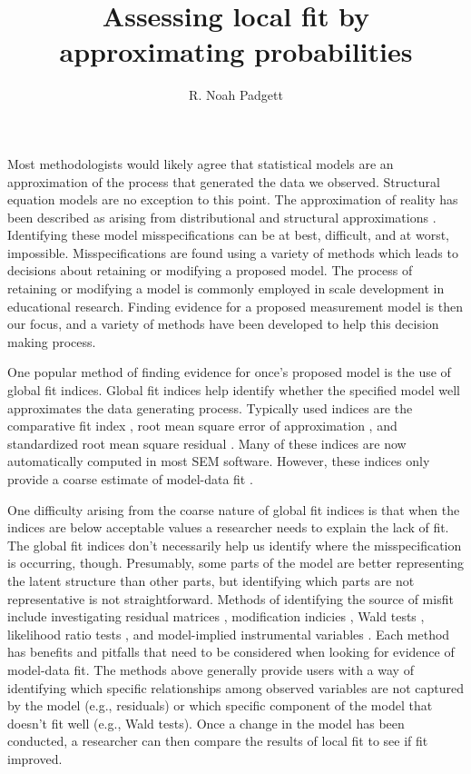 \documentclass[noextraspace, floatsintext, 12pt]{apa7}
\title{Assessing local fit by approximating probabilities}
\author{R. Noah Padgett}
\begin{document}
\maketitle

\setlength{\abovedisplayskip}{3pt}
\setlength{\belowdisplayskip}{3pt}

Most methodologists would likely agree that statistical models are an approximation of the process that generated the data we observed.
Structural equation models are no exception to this point.
The approximation of reality has been described as arising from distributional and structural approximations \citep{Bollen2019}.
Identifying these model misspecifications can be at best, difficult, and at worst, impossible.
Misspecifications are found using a variety of methods which leads to decisions about retaining or modifying a proposed model. 
The process of retaining or modifying a model is commonly employed in scale development in educational research.
Finding evidence for a proposed measurement model is then our focus, and a variety of methods have been developed to help this decision making process.

One popular method of finding evidence for once's proposed model is the use of global fit indices.
Global fit indices help identify whether the specified model well approximates the data generating process. 
Typically used indices are the comparative fit index \citep{Bentler1990},  root mean square error of approximation \citep{Browne1992}, and standardized root mean square residual \citep{Bentler1995, Maydeu2018, Joreskog1981}.
Many of these indices are now automatically computed in most SEM software.
However, these indices only provide a coarse estimate of model-data fit \citep{Steiger2007}.

One difficulty arising from the coarse nature of global fit indices is that when the indices are below acceptable values a researcher needs to explain the lack of fit. 
The global fit indices don't necessarily help us identify where the misspecification is occurring, though.
Presumably, some parts of the model are better representing the latent structure than other parts, but identifying which parts are not representative is not straightforward.
Methods of identifying the source of misfit include investigating residual matrices \citep{Kline2015, Maydeu2017}, modification indicies \citep{Sorbom1989, Kaplan1989}, Wald tests \citep{Wald1943, Buse1982}, likelihood ratio tests \citep{Neyman1928, Buse1982}, and model-implied instrumental variables \citep{Bollen1995, Bollen2019}.
Each method has benefits and pitfalls that need to be considered when looking for evidence of model-data fit. 
The methods above generally provide users with a way of identifying which specific relationships among observed variables are not captured by the model (e.g., residuals) or which specific component of the model that doesn't fit well (e.g., Wald tests).
Once a change in the model has been conducted, a researcher can then compare the results of local fit to see if fit improved.
\end{document}
